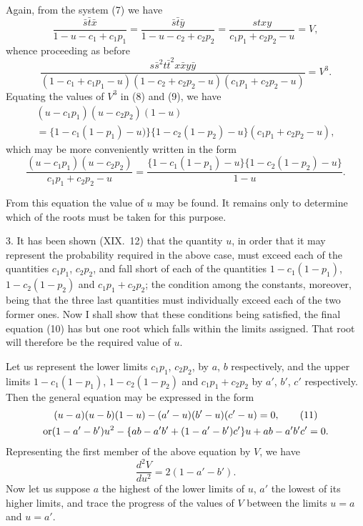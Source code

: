 \documentclass[oneside]{book}
\begin{document}
Again, from the system (7) we have
\begin{equation*}
 \frac{\bar{s}\bar{t}\bar{x}}{1-u-c_1 + c_1 p_1}
=\frac{\bar{s}\bar{t}\bar{y}}{1-u-c_2 + c_2 p_2}
=\frac{stxy}{c_1 p_1 + c_2 p_2 - u}=V,
\end{equation*}
whence proceeding as before
\begin{equation*}\tag{9}
\frac{s \bar{s}^2 t \bar{t}^2 x \bar{x} y \bar{y}}
     {(1-c_1 + c_1 p_1 - u)(1-c_2 + c_2 p_2 - u)
      (c_1 p_1 + c_2 p_2 - u)}=V^3.
\end{equation*}
Equating the values of $V^3$ in (8) and (9), we have
\[
\begin{split}
(u-c_1 p_1)(u-c_2 p_2)(1-u) \\
= \{1-c_1(1-p_1)-u)\}\{1-c_2(1-p_2)-u\}(c_1 p_1 + c_2 p_2 -u),
\end{split}
\]
which may be more conveniently written in the form
\begin{equation*}\tag{10}
\frac{(u-c_1 p_1)(u-c_2 p_2)}{c_1 p_1 + c_2 p_2 - u} =\frac{\{1-c_1(1-p_1)-u\}\{1-c_2(1-p_2)-u\}}{1-u}.
\end{equation*}

From this equation the value of $u$ may be found. It remains
only to determine which of the roots must be taken for this purpose.

3. It has been shown (XIX.~12) that the quantity $u$, in
order that it may represent the probability required in the above
case, must exceed each of the quantities $c_1 p_1$, $c_2 p_2$, and fall
short of each of the quantities $1-c_1(1-p_1)$, $1-c_2(1-p_2)$ and
$c_1 p_1 + c_2 p_2$; the condition among the constants, moreover, being
that the three last quantities must individually exceed each of
the two former ones. Now I shall show that these conditions
being satisfied, the final equation (10) has but one root which
falls within the limits assigned. That root will therefore be the
required value of $u$.

Let us represent the lower limits $c_1 p_1$, $c_2 p_2$, by $a$, $b$ respectively,
and the upper limits $1-c_1(1-p_1)$, $1-c_2(1-p_2)$ and
$c_1 p_1 + c_2 p_2$ by $a'$, $b'$, $c'$ respectively. Then the general equation
may be expressed in the form
\begin{gather*}
(u-a) (u-b) (1-u)-(a'-u) (b'-u) (c'-u) = 0,  \tag{11}\\
\text{or}\hfill (1-a'-b')u^2-\{ab-a'b'+(1-a'-b')c'\} u + ab - a'b'c' = 0.\hfill
\end{gather*}
Representing the first member of the above equation by $V$, we
have
\begin{equation*}\tag{12}
\frac{d^2 V}{du^2}=2(1 - a' - b').
\end{equation*}
Now let us suppose $a$ the highest of the lower limits of $u$, $a'$ the
lowest of its higher limits, and trace the progress of the values
of $V$ between the limits $u = a$ and $u = a'$.
\end{document}

